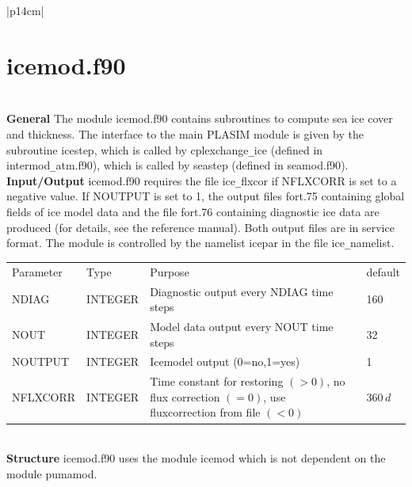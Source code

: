 \clearpage
\begin{center}
\begin{tabular}{|p{14cm}|}
\hline
\vspace{-5mm} \section{icemod.f90} \vspace{-5mm} \\
\hline
\vspace{1mm} {\bf General} The module {\module icemod.f90}
contains subroutines to compute sea ice cover and thickness.
The interface to the main PLASIM module is given by the subroutine
{\sub icestep}, which is called by {\sub cplexchange\verb#_#ice}
(defined in {\module intermod\verb#_#atm.f90}), which is called by
{\sub seastep} (defined in {\module seamod.f90}). \vspace{3mm} \\
\hline
\vspace{1mm} {\bf Input/Output} {\module icemod.f90} requires the file
{\file ice\verb#_#flxcor} if NFLXCORR is set to a negative value.
If NOUTPUT is set to 1, the output files {\file fort.75} containing
global fields of ice model data and the file {\file fort.76}
containing diagnostic ice data are produced (for details,
see the reference manual). Both output files are in service format.
The module is controlled by the namelist {\nam icepar} in the file
{\file ice\verb#_#namelist}. \vspace{1mm} \\
\begin{tabular}{p{3cm} p{2cm} p{6cm} p{2cm}}
Parameter  & Type    & Purpose 					& default \\
NDIAG	   & INTEGER & Diagnostic output every NDIAG time steps	& 160	  \\
NOUT	   & INTEGER & Model data output every NOUT time steps	& 32	  \\
NOUTPUT	   & INTEGER & Icemodel output (0=no,1=yes)		& 1	  \\
NFLXCORR   & INTEGER & Time constant for restoring $(>0)$, no flux correction $(=0)$, use fluxcorrection from file $(<0)$ & $360\,d$ \\
\end{tabular} \vspace{3mm} \\
\hline
\vspace{2mm} {\bf Structure} {\module icemod.f90} uses the module
{\modu icemod} which is not dependent on the module {\modu pumamod}.

\end{tabular}
\end{center}
